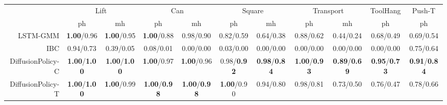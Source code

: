 



\setlength\tabcolsep{ 3 pt}
\begin{tabular}{r|cc|cc|cc|cc|c|c}
\toprule
 & \multicolumn{2}{c|}{Lift} & \multicolumn{2}{c|}{Can} & \multicolumn{2}{c|}{Square} & \multicolumn{2}{c|}{Transport} & \multicolumn{1}{c|}{ToolHang} & \multicolumn{1}{c}{Push-T} \\
 & ph & mh & ph & mh & ph & mh & ph & mh & ph & ph \\
\midrule
LSTM-GMM & \small \textbf{1.00}/0.96 & \small \textbf{1.00}/0.95 & \small \textbf{1.00}/0.88 & \small 0.98/0.90 & \small 0.82/0.59 & \small 0.64/0.38 & \small 0.88/0.62 & \small 0.44/0.24 & \small 0.68/0.49 & \small 0.69/0.54 \\
IBC & \small 0.94/0.73 & \small 0.39/0.05 & \small 0.08/0.01 & \small 0.00/0.00 & \small 0.03/0.00 & \small 0.00/0.00 & \small 0.00/0.00 & \small 0.00/0.00 & \small 0.00/0.00 & \small 0.75/0.64 \\
DiffusionPolicy-C & \small \textbf{1.00}/\textbf{1.00} & \small \textbf{1.00}/\textbf{1.00} & \small \textbf{1.00}/0.97 & \small \textbf{1.00}/0.96 & \small 0.98/\textbf{0.92} & \small \textbf{0.98}/\textbf{0.84} & \small \textbf{1.00}/\textbf{0.93} & \small \textbf{0.89}/\textbf{0.69} & \small \textbf{0.95}/\textbf{0.73} & \small \textbf{0.91}/\textbf{0.84} \\
DiffusionPolicy-T & \small \textbf{1.00}/\textbf{1.00} & \small \textbf{1.00}/0.99 & \small \textbf{1.00}/\textbf{0.98} & \small \textbf{1.00}/\textbf{0.98} & \small \textbf{1.00}/0.90 & \small 0.94/0.80 & \small 0.98/0.81 & \small 0.73/0.50 & \small 0.76/0.47 & \small 0.78/0.66 \\
\bottomrule
\end{tabular}
